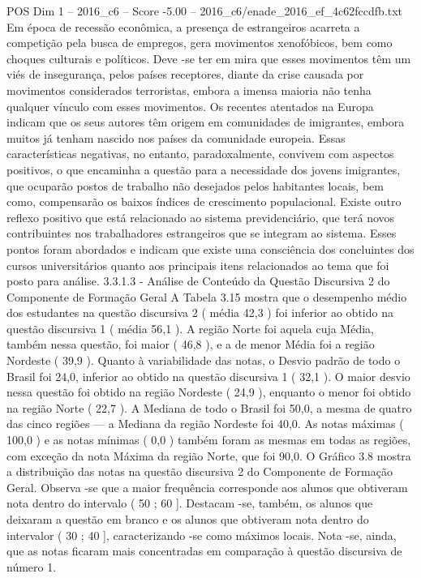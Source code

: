 \begin{textsample}{POS Dim 1 – 2016\_c6 – Score -5.00 – 2016\_c6/enade\_2016\_ef\_4c62fccdfb.txt}
Em época de recessão econômica, a presença de estrangeiros acarreta a competição pela busca de empregos, gera movimentos xenofóbicos, bem como choques culturais e políticos.
Deve -se ter em mira que esses movimentos têm um viés de insegurança, pelos países receptores, diante da crise causada por movimentos considerados terroristas, embora a imensa maioria não tenha qualquer vínculo com esses movimentos.
Os recentes atentados na Europa indicam que os seus autores têm origem em comunidades de imigrantes, embora muitos já tenham nascido nos países da comunidade europeia.
Essas características negativas, no entanto, paradoxalmente, convivem com aspectos positivos, o que encaminha a questão para a necessidade dos jovens imigrantes, que ocuparão postos de trabalho não desejados pelos habitantes locais, bem como, compensarão os baixos índices de crescimento populacional.
Existe outro reflexo positivo que está relacionado ao sistema previdenciário, que terá novos contribuintes nos trabalhadores estrangeiros que se integram ao sistema.
Esses pontos foram abordados e indicam que existe uma consciência dos concluintes dos cursos universitários quanto aos principais itens relacionados ao tema que foi posto para análise. 3.3.1.3 - Análise de Conteúdo da Questão Discursiva 2 do Componente de Formação Geral A Tabela 3.15 mostra que o desempenho médio dos estudantes na questão discursiva 2 ( média 42,3 ) foi inferior ao obtido na questão discursiva 1 ( média 56,1 ).
A região Norte foi aquela cuja Média, também nessa questão, foi maior ( 46,8 ), e a de menor Média foi a região Nordeste ( 39,9 ).
Quanto à variabilidade das notas, o Desvio padrão de todo o Brasil foi 24,0, inferior ao obtido na questão discursiva 1 ( 32,1 ).
O maior desvio nessa questão foi obtido na região Nordeste ( 24,9 ), enquanto o menor foi obtido na região Norte ( 22,7 ).
A Mediana de todo o Brasil foi 50,0, a mesma de quatro das cinco regiões — a Mediana da região Nordeste foi 40,0.
As notas máximas ( 100,0 ) e as notas mínimas ( 0,0 ) também foram as mesmas em todas as regiões, com exceção da nota Máxima da região Norte, que foi 90,0.
O Gráfico 3.8 mostra a distribuição das notas na questão discursiva 2 do Componente de Formação Geral.
Observa -se que a maior frequência corresponde aos alunos que obtiveram nota dentro do intervalo ( 50 ; 60 ].
Destacam -se, também, os alunos que deixaram a questão em branco e os alunos que obtiveram nota dentro do intervalor ( 30 ; 40 ], caracterizando -se como máximos locais.
Nota -se, ainda, que as notas ficaram mais concentradas em comparação à questão discursiva de número 1.

\end{textsample}

